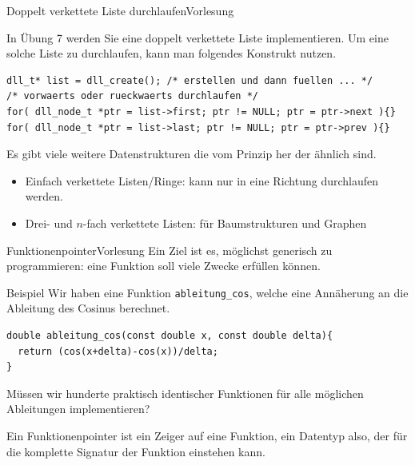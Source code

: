 \documentclass[xcolor=dvipsnames]{beamer}
\newcounter{lecturecounter}
\begin{document}
\begin{frame}[fragile]{Doppelt verkettete Liste durchlaufen}{Vorlesung }
\begin{block}{}
  In Übung 7 werden Sie eine doppelt verkettete Liste implementieren. Um eine solche Liste zu durchlaufen, kann man folgendes Konstrukt nutzen.
\end{block}
\begin{lstlisting}
dll_t* list = dll_create(); /* erstellen und dann fuellen ... */
/* vorwaerts oder rueckwaerts durchlaufen */
for( dll_node_t *ptr = list->first; ptr != NULL; ptr = ptr->next ){}
for( dll_node_t *ptr = list->last; ptr != NULL; ptr = ptr->prev ){}
\end{lstlisting}
\begin{block}{}
  Es gibt viele weitere Datenstrukturen die vom Prinzip her der ähnlich sind.
  \begin{itemize}
    \item{Einfach verkettete Listen/Ringe: kann nur in eine Richtung durchlaufen werden.}
    \item{Drei- und $n$-fach verkettete Listen: für Baumstrukturen und Graphen}
  \end{itemize}
\end{block}
\end{frame}


\begin{frame}[fragile]{Funktionenpointer}{Vorlesung }
  Ein Ziel ist es, möglichst generisch zu programmieren: eine Funktion soll viele Zwecke erfüllen können.
\begin{block}{Beispiel}
  Wir haben eine Funktion \verb|ableitung_cos|, welche eine Annäherung an die Ableitung des Cosinus berechnet.
\end{block}
\begin{lstlisting}
double ableitung_cos(const double x, const double delta){
  return (cos(x+delta)-cos(x))/delta;
}
\end{lstlisting}
Müssen wir hunderte praktisch identischer Funktionen für alle möglichen Ableitungen implementieren? 
\begin{block}{}
  Ein Funktionenpointer ist ein Zeiger auf eine Funktion, ein Datentyp also, der für die komplette Signatur der Funktion einstehen kann.
\end{block}
\end{frame}
\end{document}

